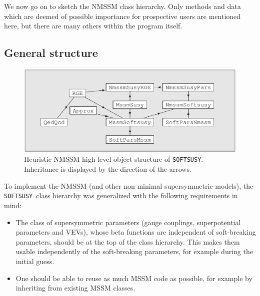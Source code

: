 \documentclass[final,3p,times]{elsarticle}
\def\SOFTSUSY{{\tt SOFTSUSY}}
\begin{document}
We now go on to sketch the NMSSM class hierarchy.  Only methods and
data which are deemed of possible importance for prospective users are
mentioned here, but there are many others within the program itself.


\subsection{General structure}

\begin{figure}
  \begin{center}
\includegraphics[width=345pt]{nmssmobj.eps}
\end{center}
\caption{Heuristic NMSSM high-level object structure of
  \SOFTSUSY\@. Inheritance is 
displayed by the direction of the arrows. \label{fig:objstruc}}
\end{figure}

To implement the NMSSM (and other non-minimal supersymmetric models),
the \SOFTSUSY~class hierarchy was generalized with the following
requirements in mind:
%
\begin{itemize}
\item The class of supersymmetric parameters (gauge couplings,
  superpotential parameters and VEVs), whose beta functions are
  independent of soft-breaking parameters, should be at the top of the
  class hierarchy.  This makes them usable independently of the
  soft-breaking parameters, for example during the initial guess.

\item One should be able to reuse as much MSSM code as possible, for
  example by inheriting from existing MSSM classes.
\end{itemize}
\end{document}
